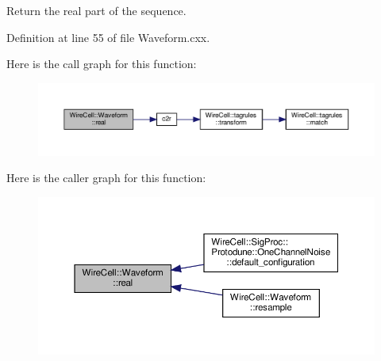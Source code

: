 Return the real part of the sequence. 



Definition at line 55 of file Waveform.\+cxx.

Here is the call graph for this function\+:
\nopagebreak
\begin{figure}[H]
\begin{center}
\leavevmode
\includegraphics[width=350pt]{namespace_wire_cell_1_1_waveform_a40f3344b248eea24a08d391e8f402bb8_cgraph}
\end{center}
\end{figure}
Here is the caller graph for this function\+:
\nopagebreak
\begin{figure}[H]
\begin{center}
\leavevmode
\includegraphics[width=350pt]{namespace_wire_cell_1_1_waveform_a40f3344b248eea24a08d391e8f402bb8_icgraph}
\end{center}
\end{figure}
\mbox{\label{namespace_wire_cell_1_1_waveform_abd675d86a770025f3ace47b277bf0e0e}} 
